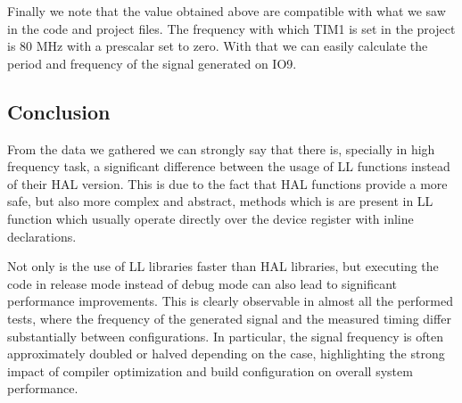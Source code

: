 \documentclass[../main.tex]{subfiles}
\begin{document}
\newpage
Finally we note that the value obtained above are compatible with what we saw in the code and project files. The frequency with which TIM1 is set in the project is 80 MHz with a prescalar set to zero. With that we can easily calculate the period and frequency of the signal generated on IO9.


\subsection{Conclusion}


From the data we gathered we can strongly say that there is, specially in high frequency task, a significant difference between the usage of LL functions instead of their HAL version. 
This is due to the fact that HAL functions provide a more safe, but also more complex and abstract, methods which is are present in LL function which usually operate directly over the device register with inline declarations.

Not only is the use of LL libraries faster than HAL libraries, but executing the code in release mode instead of debug mode can also lead to significant performance improvements. 
This is clearly observable in almost all the performed tests, where the frequency of the generated signal and the measured timing differ substantially between configurations. In particular, the signal frequency is often approximately doubled or halved depending on the case, highlighting the strong impact of compiler optimization and build configuration on overall system performance.
\end{document}
